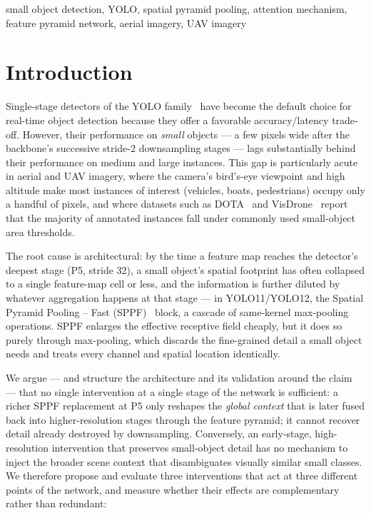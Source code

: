 \documentclass[conference]{IEEEtran}
\begin{document}
\begin{IEEEkeywords}
small object detection, YOLO, spatial pyramid pooling, attention mechanism, feature pyramid network, aerial imagery, UAV imagery
\end{IEEEkeywords}

\section{Introduction}
\label{sec:intro}

Single-stage detectors of the YOLO family~\cite{redmon2016yolo} have become the
default choice for real-time object detection because they offer a favorable
accuracy/latency trade-off. However, their performance on \emph{small}
objects --- a few pixels wide after the backbone's successive stride-2
downsampling stages --- lags substantially behind their performance on
medium and large instances. This gap is particularly acute in aerial and
UAV imagery, where the camera's bird's-eye viewpoint and high altitude make
most instances of interest (vehicles, boats, pedestrians) occupy only a
handful of pixels, and where datasets such as DOTA~\cite{xia2018dota} and
VisDrone~\cite{zhu2021visdrone} report that the majority of annotated
instances fall under commonly used small-object area thresholds.

The root cause is architectural: by the time a feature map reaches the
detector's deepest stage (P5, stride 32), a small object's spatial footprint
has often collapsed to a single feature-map cell or less, and the
information is further diluted by whatever aggregation happens at that
stage --- in YOLO11/YOLO12, the Spatial Pyramid Pooling -- Fast
(SPPF)~\cite{he2015spp} block, a cascade of same-kernel max-pooling
operations. SPPF enlarges the effective receptive field cheaply, but it
does so purely through max-pooling, which discards the fine-grained detail
a small object needs and treats every channel and spatial location
identically.

We argue --- and structure the architecture and its validation around the
claim --- that no
single intervention at a single stage of the network is sufficient: a
richer SPPF replacement at P5 only reshapes the \emph{global context} that
is later fused back into higher-resolution stages through the feature
pyramid; it cannot recover detail already destroyed by downsampling.
Conversely, an early-stage, high-resolution intervention that preserves
small-object detail has no mechanism to inject the broader scene context
that disambiguates visually similar small classes. We therefore propose
and evaluate three interventions that act at three different points of the
network, and measure whether their effects are complementary rather than
redundant:
\end{document}
